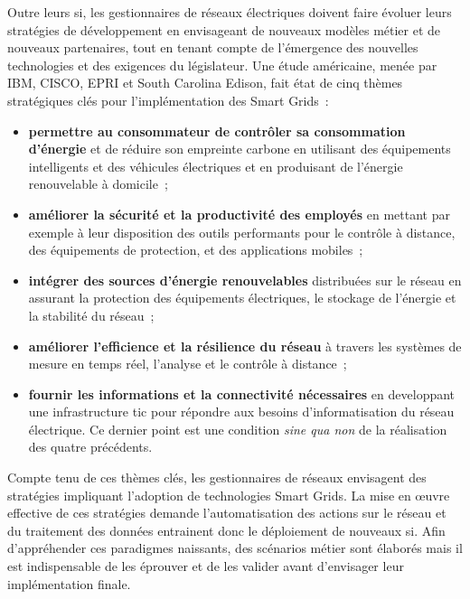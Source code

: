 Outre leurs \gls{si}, les gestionnaires de réseaux électriques doivent faire évoluer 
leurs stratégies de développement en envisageant de nouveaux modèles métier et 
de nouveaux partenaires, tout en tenant compte de l'émergence des nouvelles 
technologies et des exigences du législateur. Une étude américaine, menée par 
IBM, CISCO, EPRI et South Carolina Edison, fait état de cinq thèmes stratégiques 
clés pour l'implémentation des Smart Grids~:
\begin{itemize}
    \item \textbf{permettre au consommateur de contrôler sa consommation 
    d'énergie} et de réduire son empreinte carbone en utilisant des équipements 
    intelligents et des véhicules électriques et en produisant de l'énergie 
    renouvelable à domicile~;

    \item \textbf{améliorer la sécurité et la productivité des employés} en 
    mettant par exemple à leur disposition des outils performants pour le 
    contrôle à distance, des équipements de protection, et des applications 
    mobiles~; 

    \item \textbf{intégrer des sources d'énergie renouvelables} distribuées sur 
    le réseau en assurant la protection des équipements électriques, le 
    stockage de l'énergie et la stabilité du réseau~; 

    \item \textbf{améliorer l'efficience et la résilience du réseau} à travers 
    les systèmes de mesure en temps réel, l'analyse et le contrôle à distance~;

    \item \textbf{fournir les informations et la connectivité nécessaires} en
    developpant une infrastructure \gls{tic} pour répondre aux besoins 
    d'informatisation du réseau électrique. Ce dernier point est une condition 
    \textit{sine qua non} de la réalisation des quatre précédents.
\end{itemize}

Compte tenu de ces thèmes clés, les gestionnaires de réseaux envisagent des 
stratégies impliquant l'adoption de technologies Smart Grids. 
La mise en œuvre effective de ces stratégies demande l'automatisation des 
actions sur le réseau et du traitement des données entrainent donc le 
déploiement de nouveaux \gls{si}. Afin d'appréhender ces paradigmes naissants, des 
scénarios métier sont élaborés mais il est indispensable de les éprouver et de 
les valider avant d'envisager leur implémentation finale.

